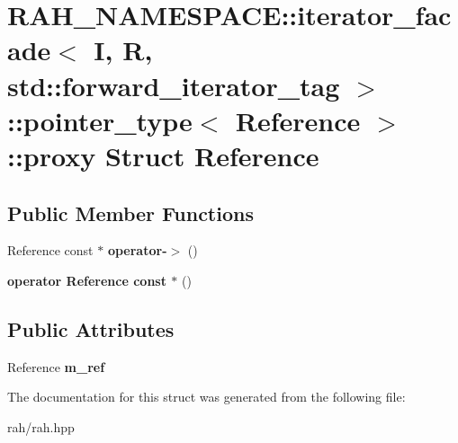 \hypertarget{struct_r_a_h___n_a_m_e_s_p_a_c_e_1_1iterator__facade_3_01_i_00_01_r_00_01std_1_1forward__iterato3fe5d6b1f3640cd0444b883f952b0798}{}\section{R\+A\+H\+\_\+\+N\+A\+M\+E\+S\+P\+A\+CE\+::iterator\+\_\+facade$<$ I, R, std\+::forward\+\_\+iterator\+\_\+tag $>$\+::pointer\+\_\+type$<$ Reference $>$\+::proxy Struct Reference}
\label{struct_r_a_h___n_a_m_e_s_p_a_c_e_1_1iterator__facade_3_01_i_00_01_r_00_01std_1_1forward__iterato3fe5d6b1f3640cd0444b883f952b0798}
\subsection*{Public Member Functions}
\begin{DoxyCompactItemize}
\item 
\mbox{\label{struct_r_a_h___n_a_m_e_s_p_a_c_e_1_1iterator__facade_3_01_i_00_01_r_00_01std_1_1forward__iterato3fe5d6b1f3640cd0444b883f952b0798_a75fc84f754825494714e93b36378c456}} 
Reference const  $\ast$ {\bfseries operator-\/$>$} ()
\item 
\mbox{\label{struct_r_a_h___n_a_m_e_s_p_a_c_e_1_1iterator__facade_3_01_i_00_01_r_00_01std_1_1forward__iterato3fe5d6b1f3640cd0444b883f952b0798_a6bce9882927bc5a7b969335f95d41c70}} 
{\bfseries operator Reference const $\ast$} ()
\end{DoxyCompactItemize}
\subsection*{Public Attributes}
\begin{DoxyCompactItemize}
\item 
\mbox{\label{struct_r_a_h___n_a_m_e_s_p_a_c_e_1_1iterator__facade_3_01_i_00_01_r_00_01std_1_1forward__iterato3fe5d6b1f3640cd0444b883f952b0798_a0bdb83fb57f5449a769a8b9e636fbefc}} 
Reference {\bfseries m\+\_\+ref}
\end{DoxyCompactItemize}


The documentation for this struct was generated from the following file\+:\begin{DoxyCompactItemize}
\item 
rah/rah.\+hpp\end{DoxyCompactItemize}
